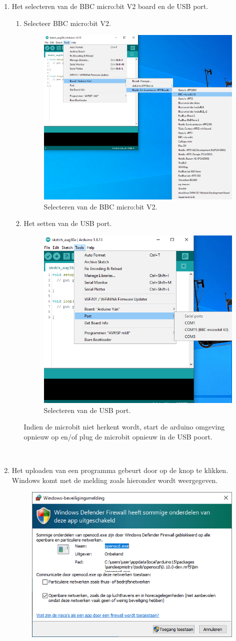 \begin{enumerate}
	\item Het selecteren van de BBC micro:bit V2 board en de USB port.
	\begin{enumerate}
		\item Selecteer BBC micro:bit V2.
		\begin{figure}[h!]
			\captionsetup{justification=centering}
			\includegraphics[width=0.45 \linewidth]{figuren/selBBCV2}
			\centering
			\caption{Selecteren van de BBC micro:bit V2.}
			\label{fig:selBoard}
		\end{figure}
	    \item Het setten van de USB port.
	     	\begin{figure}[h!]
	     	\captionsetup{justification=centering}
	     	\includegraphics[width=0.45 \linewidth]{figuren/selBBCPort}
	     	\centering
	     	\caption{Selecteren van de USB port.}
	     	\label{fig:selUSB}
	     \end{figure}
     Indien de microbit niet herkent wordt, start de arduino omgeving opnieuw op en/of plug de microbit opnieuw in de USB poort.
	\end{enumerate}
~ 
   \item Het uploaden van een programma gebeurt door op de knop  te klikken. Windows komt met de melding zoals hieronder wordt weergegeven. 
   	\begin{figure}[h!]
   	\captionsetup{justification=centering}
   	\includegraphics[width=0.45 \linewidth]{figuren/windowsDefSec}

\end{figure}
\end{enumerate}
